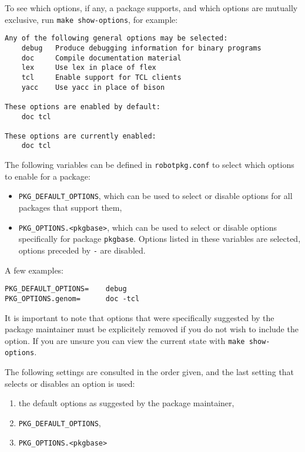 To see   which options, if  any, a   package supports,  and  which  options are
mutually exclusive, run {\tt make show-options}, for example:

\begin{verbatim}
Any of the following general options may be selected:
    debug   Produce debugging information for binary programs
    doc     Compile documentation material
    lex     Use lex in place of flex
    tcl     Enable support for TCL clients
    yacc    Use yacc in place of bison

These options are enabled by default:
    doc tcl

These options are currently enabled:
    doc tcl
\end{verbatim}

The following variables can be defined  in {\tt robotpkg.conf} to select which
options to enable for a package:

\begin{itemize}
   \item {\tt PKG\_DEFAULT\_OPTIONS}, which can be used to select or  disable
   options  for  all packages  that  support them,

   \item {\tt PKG\_OPTIONS.<pkgbase>}, which can  be   used  to select  or
   disable   options specifically for package {\tt pkgbase}. Options listed
   in these variables are selected, options preceded by {\tt -} are disabled.
\end{itemize}

A few examples:

\begin{verbatim}
PKG_DEFAULT_OPTIONS=    debug
PKG_OPTIONS.genom=      doc -tcl
\end{verbatim}

It is important to note  that options that were  specifically suggested by  the
package  maintainer must be  explicitely removed if you  do not wish to include
the option.  If you  are unsure you  can view the current  state with {\tt make
show-options}.

The following settings are  consulted in the order  given, and the last setting
that selects or disables an option is used:

\begin{enumerate}
   \item the default options as suggested by the package maintainer,

   \item {\tt PKG\_DEFAULT\_OPTIONS},

   \item {\tt PKG\_OPTIONS.<pkgbase>}
\end{enumerate}

